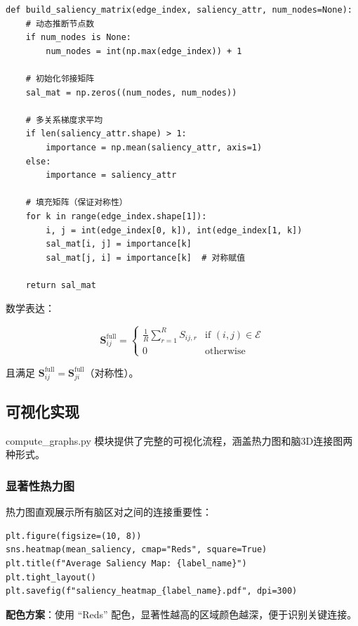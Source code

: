 \begin{verbatim}
def build_saliency_matrix(edge_index, saliency_attr, num_nodes=None):
    # 动态推断节点数
    if num_nodes is None:
        num_nodes = int(np.max(edge_index)) + 1
    
    # 初始化邻接矩阵
    sal_mat = np.zeros((num_nodes, num_nodes))
    
    # 多关系梯度求平均
    if len(saliency_attr.shape) > 1:
        importance = np.mean(saliency_attr, axis=1)
    else:
        importance = saliency_attr

    # 填充矩阵（保证对称性）
    for k in range(edge_index.shape[1]):
        i, j = int(edge_index[0, k]), int(edge_index[1, k])
        sal_mat[i, j] = importance[k]
        sal_mat[j, i] = importance[k]  # 对称赋值
        
    return sal_mat
\end{verbatim}

数学表达：

\begin{equation}
\mathbf{S}^{\text{full}}_{ij} = \begin{cases}
\frac{1}{R} \sum_{r=1}^{R} S_{ij,r} & \text{if } (i,j) \in \mathcal{E} \\
0 & \text{otherwise}
\end{cases}
\end{equation}

且满足 $\mathbf{S}^{\text{full}}_{ij} = \mathbf{S}^{\text{full}}_{ji}$（对称性）。

\subsection{可视化实现}

compute\_graphs.py 模块提供了完整的可视化流程，涵盖热力图和脑3D连接图两种形式。

\subsubsection{显著性热力图}

热力图直观展示所有脑区对之间的连接重要性：

\begin{verbatim}
plt.figure(figsize=(10, 8))
sns.heatmap(mean_saliency, cmap="Reds", square=True)
plt.title(f"Average Saliency Map: {label_name}")
plt.tight_layout()
plt.savefig(f"saliency_heatmap_{label_name}.pdf", dpi=300)
\end{verbatim}

\textbf{配色方案}：使用 ``Reds'' 配色，显著性越高的区域颜色越深，便于识别关键连接。

